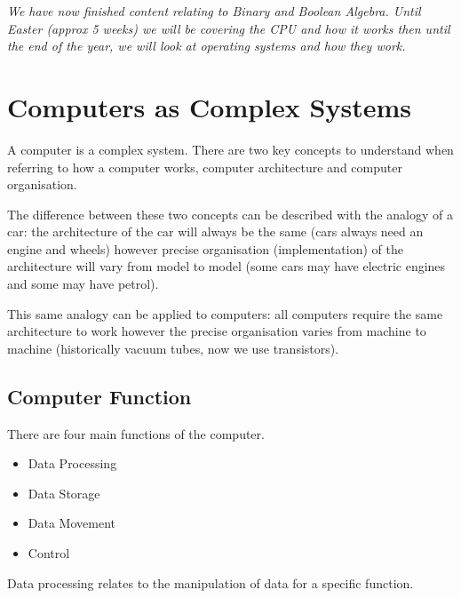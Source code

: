 
\textit{We have now finished content relating to Binary and Boolean Algebra. Until Easter (approx 5 weeks) we will be covering the CPU and how it works then until the end of the year, we will look at operating systems and how they work.}

\section*{Computers as Complex Systems}
A computer is a complex system. There are two key concepts to understand when referring to how a computer works, computer architecture and computer organisation.

The difference between these two concepts can be described with the analogy of a car: the architecture of the car will always be the same (cars always need an engine and wheels) however precise organisation (implementation) of the architecture will vary from model to model (some cars may have electric engines and some may have petrol).

This same analogy can be applied to computers: all computers require the same architecture to work however the precise organisation varies from machine to machine (historically vacuum tubes, now we use transistors).


\subsection*{Computer Function}
There are four main functions of the computer.
\begin{itemize}
    \item Data Processing
    \item Data Storage
    \item Data Movement
    \item Control
\end{itemize}
Data processing relates to the manipulation of data for a specific function.

